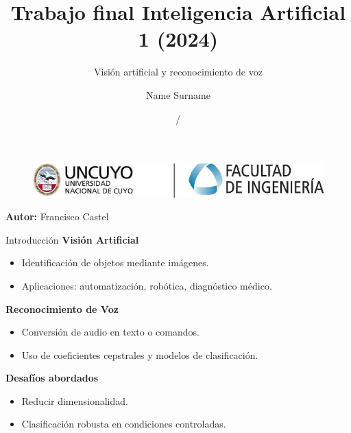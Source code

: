 \documentclass[12pt]{beamer}
\title[Insitute]{Trabajo final Inteligencia Artificial 1 (2024)}
\subtitle{
Visión artificial y reconocimiento de voz}
\author[Name Surname]{Name Surname}
\institute[]{Universidad Nacional de Cuyo, Facultad de Ingeniería}
\date{\currentyear/\nextyear} %
\begin{document}
\begin{frame}{}
\vspace{\fill}

\begin{figure}[t]
    \centering
    \includegraphics[width=0.5\linewidth]{logofing.png}

\end{figure}

\vspace{\fill}

\Large
\color{main}
\inserttitle

\medskip

\large
\color{black}
\insertsubtitle

\vspace{\fill}

\footnotesize
\insertinstitute

\vspace{\fill}

\textbf{Autor:} Francisco Castel

\medskip

\insertdate

\vspace{\fill}
\end{frame}

\begin{frame}{Introducción}
    \textbf{Visión Artificial}
    \begin{itemize}
        \item Identificación de objetos mediante imágenes.
        \item Aplicaciones: automatización, robótica, diagnóstico médico.
    \end{itemize}

    \vspace{0.5cm}  %

    \textbf{Reconocimiento de Voz}
    \begin{itemize}
        \item Conversión de audio en texto o comandos.
        \item Uso de coeficientes cepstrales y modelos de clasificación.
    \end{itemize}

    \vspace{0.5cm}  %

    \textbf{Desafíos abordados}
    \begin{itemize}
        \item Reducir dimensionalidad.
        \item Clasificación robusta en condiciones controladas.
    \end{itemize}
\end{frame}
\end{document}
